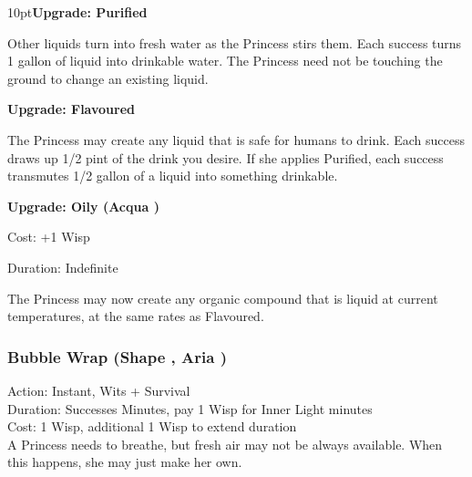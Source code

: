 \begin{myindentpar}{10pt}\textbf{Upgrade: Purified}

Other liquids turn into fresh water as the Princess stirs them. Each success turns 1 gallon of liquid into drinkable water. The Princess need not be touching the ground to change an existing liquid.

\textbf{Upgrade: Flavoured}

The Princess may create any liquid that is safe for humans to drink. Each success draws up 1/2 pint of the drink you desire. If she applies Purified, each success transmutes 1/2 gallon of a liquid into something drinkable.

\textbf{Upgrade: Oily (Acqua \textbullet\textbullet)}

\noindent Cost: +1 Wisp

\noindent Duration: Indefinite

\noindent The Princess may now create any organic compound that is liquid at current temperatures, at the same rates as Flavoured.\end{myindentpar}


\subsubsection*{Bubble Wrap (Shape \textbullet, Aria \textbullet)}
\noindent Action: Instant, Wits + Survival\\

\noindent Duration: Successes Minutes, pay 1 Wisp for Inner Light minutes\\

\noindent Cost: 1 Wisp, additional 1 Wisp to extend duration\\

\noindent A Princess needs to breathe, but fresh air may not be always available. When this happens, she may just make her own.

